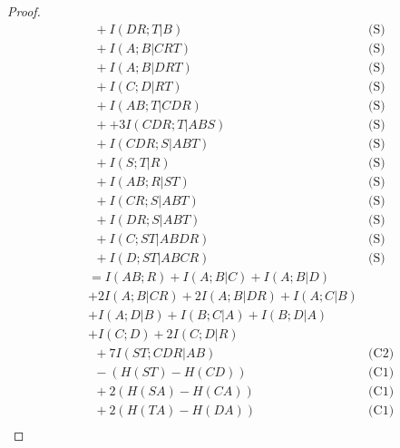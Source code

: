 \documentclass[10pt,journal]{IEEEtran}
\begin{document}
\begin{proof}
\begin{align*}
      &\ \  + I(DR;T|B)                                                         & \text{(S)} \\
      &\ \  + I(A;B|CRT)                                                        & \text{(S)} \\
      &\ \  + I(A;B|DRT)                                                        & \text{(S)} \\
      &\ \  + I(C;D|RT)                                                         & \text{(S)} \\
      &\ \  + I(AB;T|CDR)                                                       & \text{(S)} \\
      &\ \  + + 3I(CDR;T|ABS)                                                     & \text{(S)} \\
      &\ \  + I(CDR;S|ABT)                                                      & \text{(S)} \\
      &\ \  + I(S;T|R)                                                          & \text{(S)} \\
      &\ \  + I(AB;R|ST)                                                        & \text{(S)} \\
      &\ \  + I(CR;S|ABT)                                                       & \text{(S)} \\
      &\ \  + I(DR;S|ABT)                                                       & \text{(S)} \\
      &\ \  + I(C;ST|ABDR)                                                      & \text{(S)} \\
      &\ \  + I(D;ST|ABCR)                                                      & \text{(S)} \\
      & = I(AB;R)+I(A;B|C)+I(A;B|D)&\\
      & +2I(A;B|CR)+2I(A;B|DR)+I(A;C|B)&\\
      & +I(A;D|B) +I(B;C|A)+I(B;D|A)&\\
      & +I(C;D)+2I(C;D|R)&\\
      &\ \   + 7I(ST;CDR|AB)                                                     & \text{(C2)} \\
      &\ \   - (H(ST)-H(CD))                                                     & \text{(C1)} \\
      &\ \   + 2(H(SA)-H(CA))                                                    & \text{(C1)} \\
      &\ \   + 2(H(TA)-H(DA))                                                    & \text{(C1)} \\

\end{align*}
\end{proof}
\end{document}
